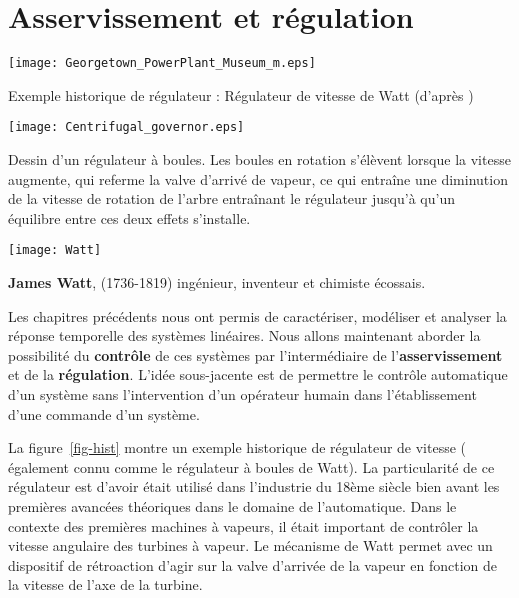 \section{Asservissement et régulation}
\begin{marginfigure}
    \centering
    \texttt{[image: Georgetown\_PowerPlant\_Museum\_m.eps]}
    \caption{Exemple historique de régulateur : Régulateur 
             de vitesse de Watt (d'après \cite{watt})\label{fig-hist}}
\end{marginfigure}
\begin{marginfigure}
    \centering
    \texttt{[image: Centrifugal\_governor.eps]} 
    \caption*{Dessin d'un régulateur à boules. Les boules en rotation s'élèvent 
    lorsque la vitesse augmente, qui referme la valve d'arrivé de vapeur, ce qui 
    entraîne une diminution de la vitesse de rotation de l'arbre entraînant 
    le régulateur jusqu'à qu'un équilibre entre ces deux effets s'installe.}
\end{marginfigure}
\begin{marginfigure}
    \centering
    \texttt{[image: Watt]}
    \caption*{\textbf{James Watt}, 
             (1736-1819) ingénieur, inventeur et chimiste écossais.}
\end{marginfigure}
Les chapitres précédents nous ont permis de caractériser, modéliser et
analyser la réponse temporelle des systèmes linéaires.
Nous allons maintenant aborder la possibilité du \textbf{contrôle} de ces 
systèmes par l'intermédiaire de l'\textbf{asservissement} et de 
la \textbf{régulation}. 
L'idée sous-jacente est de permettre le contrôle automatique d'un système
sans l'intervention d'un opérateur humain dans l'établissement d'une commande
d'un système. 

La figure~\ref{fig-hist} montre un exemple historique de régulateur de 
vitesse ( également connu comme le régulateur à boules de Watt). 
La particularité de ce régulateur est d'avoir était utilisé dans l'industrie
du 18ème siècle bien avant les premières avancées théoriques dans le domaine 
de l'automatique. Dans le contexte des premières machines à vapeurs, 
il était important de contrôler la vitesse angulaire des turbines à vapeur. 
Le mécanisme de Watt permet avec un dispositif de rétroaction d'agir sur la 
valve d'arrivée de la vapeur en fonction de la vitesse de l'axe de la turbine.

